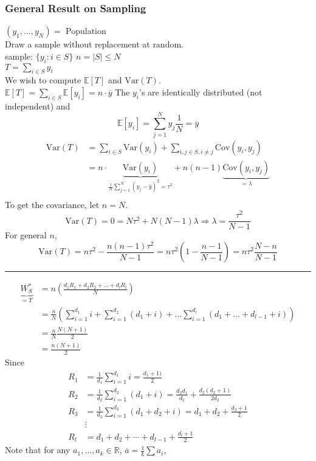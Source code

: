 \documentclass[a4paper,12pt]{amsart}
\newcommand{\Var}{\mbox{Var}}
\newcommand{\Cov}{\mbox{Cov}}
\newcommand{\E}[1]{\mathbb{E}\left[#1\right]}
\begin{document}
\subsubsection{General Result on Sampling}
$(y_1,\ldots,y_N) = $ Population\\
Draw a sample without replacement at random.\\
sample: $\{y_i: i \in S\}$ $n = |S| \leq N$\\
$\displaystyle T = \sum_{i \in S} y_i$\\
We wish to compute $\E{T}$ and $\Var(T)$.\\
$\displaystyle \E{T} = \sum_{i \in S} \E{y_i} = n \cdot \overline{y}$ The $y_i$'s are identically distributed (not independent) and 
\[\E{y_i} = \sum_{j=1}^N y_j \frac{1}{N} = \overline{y}\] 
\begin{align*}
\Var(T) &= \sum_{i \in S} \Var(y_i) + \sum_{i,j \in S, i \neq j} \Cov(y_i,y_j)\\
&= n \cdot \underbrace{\Var(y_i)}_{\displaystyle \frac{1}{N} \sum_{j=1}^N (y_j - \overline{y})^2 = \tau^2} + n(n-1) \underbrace{\Cov(y_i,y_j)}_{ = \lambda}\\
\end{align*}
To get the covariance, let $n=N$.
\[\Var(T) =0 = N \tau^2 + N(N-1) \lambda \Rightarrow \lambda = \frac{\tau^2}{N-1} \]
For general $n$, 
\[\Var(T) = n \tau^2 - \frac{n(n-1)\tau^2}{N-1} = n \tau^2\left(1 - \frac{n-1}{N-1}\right) = n \tau^2 \frac{N-n}{N-1}\]
\hrule
\begin{align*}
{\underbrace{W_S^\ast}_{=T}} &= n\left(\frac{d_1R_1 + d_2R_2 + \ldots + d_lR_l}{N}\right)\\
&= \frac{n}{N}\left(\sum_{i=1}^{d_1} i + \sum_{i=1}^{d_2} (d_1 + i) + \ldots \sum_{i=1}^{d_l} (d_1 + \ldots + d_{l-1} + i)\right)\\
&= \frac{n}{N} \frac{N(N+1)}{2}\\
&= \frac{n(N+1)}{2}
\end{align*}
Since
\begin{align*}
R_1 &= \frac{1}{d_1}\sum_{i=1}^{d_1} i = \frac{d_1+1)}{2}\\
R_2 &= \frac{1}{d_2}\sum_{i=1}^{d_2}(d_1 + i) = \frac{d_2 d_1}{d_2} + \frac{d_2(d_2+1)}{2d_2}\\
R_3 &= \frac{1}{d_3} \sum_{i=1}^{d_3} (d_1 + d_2 + i) = d_1 + d_2 + \frac{d_3 +1}{2}\\
&\vdots\\
R_l &= d_1 + d_2 + \cdots + d_{l-1} + \frac{d_l+1}{2}
\end{align*}
Note that for any $a_1 ,\ldots, a_k \in \mathbb{R}$, $\overline{a} = \frac{1}{k}\sum a_i$, 
\end{document}
